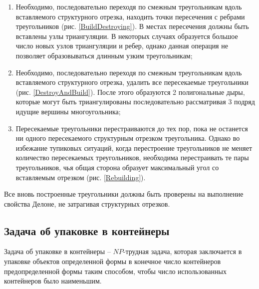 \documentclass{fefu}
\begin{document}
\begin{enumerate}
    \item Необходимо, последовательно переходя по смежным треугольникам вдоль вставляемого структурного отрезка, находить
    точки пересечения с ребрами треугольников (рис. \ref{BuildDestroying}). В местах пересечения должны быть вставлены узлы триангуляции. В некоторых
    случаях образуется большое число новых узлов триангуляции и ребер, однако данная операция не позволяет образовываться
    длинным узким треугольникам;
    \item Необходимо, последовательно переходя по смежным треугольникам вдоль вставляемого структурного отрезка, удалить
    все пересекаемые треугольники (рис. \ref{DestroyAndBuild}). После этого образуются 2 полигональные дыры, которые могут быть триангулированы
    последовательно рассматривая 3 подряд идущие вершины многоугольника;
    \item Пересекаемые треугольники перестраиваются до тех пор, пока не останется ни одного пересекаемого структурным
    отрезком треугольника. Однако во избежание тупиковых ситуаций, когда перестроение треугольников не меняет количество
    пересекаемых треугольников, необходима перестраивать те пары треугольников, чья общая сторона образует максимальный
    угол со вставляемым отрезком (рис. \ref{Rebuilding}).
\end{enumerate}

Все вновь построенные треугольники должны быть проверены на выполнение свойства Делоне, не затрагивая структурных
отрезков.
\subsection{Задача об упаковке в контейнеры}
Задача об упаковке в контейнеры -- $NP$-трудная задача, которая заключается в упаковке объектов определенной формы в
конечное число контейнеров предопределенной формы таким способом, чтобы число использованных контейнеров было
наименьшим.
\end{document}
